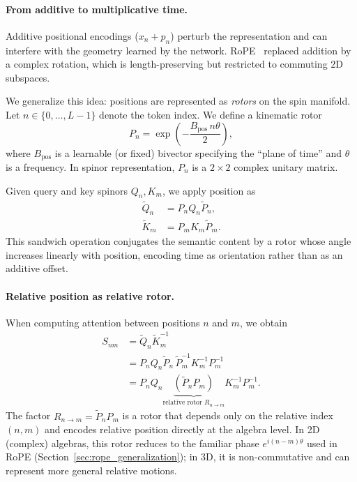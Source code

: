\documentclass{article}
\theoremstyle{plain}
\theoremstyle{definition}
\theoremstyle{remark}
\begin{document}
\paragraph{From additive to multiplicative time.}
Additive positional encodings ($x_n + p_n$) perturb the representation and can interfere with the geometry learned by the network. RoPE~\cite{su2024roformer} replaced addition by a complex rotation, which is length-preserving but restricted to commuting $2$D subspaces.

We generalize this idea: positions are represented as \emph{rotors} on the spin manifold. Let $n \in \{0,\dots,L-1\}$ denote the token index. We define a kinematic rotor
\begin{equation}
    P_n = \exp\left(-\frac{B_{\text{pos}}\, n \theta}{2}\right),
\end{equation}
where $B_{\text{pos}}$ is a learnable (or fixed) bivector specifying the ``plane of time'' and $\theta$ is a frequency. In spinor representation, $P_n$ is a $2\times2$ complex unitary matrix.

Given query and key spinors $Q_n, K_m$, we apply position as
\begin{align}
    \tilde{Q}_n &= P_n Q_n \tilde{P}_n,\\
    \tilde{K}_m &= P_m K_m \tilde{P}_m.
\end{align}
This sandwich operation conjugates the semantic content by a rotor whose angle increases linearly with position, encoding time as orientation rather than as an additive offset.

\paragraph{Relative position as relative rotor.}
When computing attention between positions $n$ and $m$, we obtain
\begin{align}
    S_{nm} &= \tilde{Q}_n \tilde{K}_m^{-1} \nonumber\\
           &= P_n Q_n \tilde{P}_n \,\tilde{P}_m^{-1} K_m^{-1} P_m^{-1} \nonumber\\
           &= P_n Q_n \underbrace{(\tilde{P}_n P_m)}_{\text{relative rotor }R_{n\to m}} K_m^{-1} P_m^{-1}.
\end{align}
The factor $R_{n\to m} = \tilde{P}_n P_m$ is a rotor that depends only on the relative index $(n,m)$ and encodes relative position directly at the algebra level. In 2D (complex) algebras, this rotor reduces to the familiar phase $e^{i(n-m)\theta}$ used in RoPE (Section~\ref{sec:rope_generalization}); in 3D, it is non-commutative and can represent more general relative motions.
\end{document}
